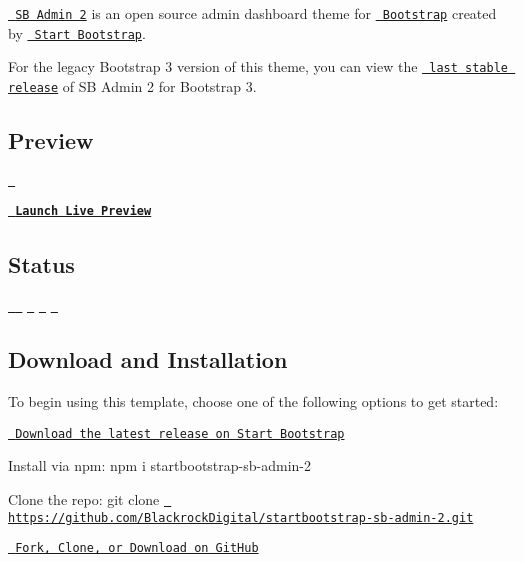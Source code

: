 \href{https://startbootstrap.com/template-overviews/sb-admin-2/}{\texttt{ SB Admin 2}} is an open source admin dashboard theme for \href{http://getbootstrap.com/}{\texttt{ Bootstrap}} created by \href{http://startbootstrap.com/}{\texttt{ Start Bootstrap}}.

For the legacy Bootstrap 3 version of this theme, you can view the \href{https://github.com/BlackrockDigital/startbootstrap-sb-admin-2/releases/tag/v3.3.7%2B1}{\texttt{ last stable release}} of SB Admin 2 for Bootstrap 3.

\subsection*{Preview}

\href{https://blackrockdigital.github.io/startbootstrap-sb-admin-2/}{\texttt{ }}

{\bfseries{\href{https://blackrockdigital.github.io/startbootstrap-sb-admin-2/}{\texttt{ Launch Live Preview}}}}

\subsection*{Status}

\href{https://raw.githubusercontent.com/BlackrockDigital/startbootstrap-sb-admin-2/master/LICENSE}{\texttt{ }} \href{https://www.npmjs.com/package/startbootstrap-sb-admin-2}{\texttt{ }} \href{https://travis-ci.org/BlackrockDigital/startbootstrap-sb-admin-2}{\texttt{ }} \href{https://david-dm.org/BlackrockDigital/startbootstrap-sb-admin-2}{\texttt{ }} \href{https://david-dm.org/BlackrockDigital/startbootstrap-sb-admin-2?type=dev}{\texttt{ }}

\subsection*{Download and Installation}

To begin using this template, choose one of the following options to get started\+:


\begin{DoxyItemize}
\item \href{https://startbootstrap.com/template-overviews/sb-admin-2/}{\texttt{ Download the latest release on Start Bootstrap}}
\item Install via npm\+: {\ttfamily npm i startbootstrap-\/sb-\/admin-\/2}
\item Clone the repo\+: {\ttfamily git clone \href{https://github.com/BlackrockDigital/startbootstrap-sb-admin-2.git}{\texttt{ https\+://github.\+com/\+Blackrock\+Digital/startbootstrap-\/sb-\/admin-\/2.\+git}}}
\item \href{https://github.com/BlackrockDigital/startbootstrap-sb-admin-2}{\texttt{ Fork, Clone, or Download on Git\+Hub}}
\end{DoxyItemize}

